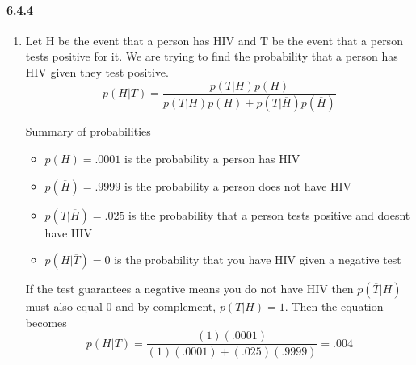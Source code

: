 \documentclass[11pt, letterpaper, twocolumn, fleqn]{article}
\begin{document}
\paragraph{6.4.4}
\begin{enumerate}
  \item Let H be the event that a person has HIV and T be the event that a person tests positive for it. We are trying to find the probability that a person has HIV given they test positive.
    $$p(H|T) = \frac{p(T|H)p(H)}{p(T|H)p(H) + p(T|\overline{H})p(\overline{H})}$$
  
  Summary of probabilities
  \begin{itemize}
    \item $p(H) = .0001$ is the probability a person has HIV
    \item $p(\overline{H}) = .9999$ is the probability a person does not have HIV
    \item $p(T|\overline{H}) = .025$ is the probability that a person tests positive and doesnt have HIV
    \item $p(H|\overline{T}) = 0$ is the probability that you have HIV given a negative test
  \end{itemize} 
  
  If the test guarantees a negative means you do not have HIV then  $p(\overline{T}|H)$ must also equal 0 and by complement, $p(T|H) = 1$. Then the equation becomes
    $$p(H|T) = \frac{(1)(.0001)}{(1)(.0001)+(.025)(.9999)} = .004$$
\end{enumerate}
\end{document}
